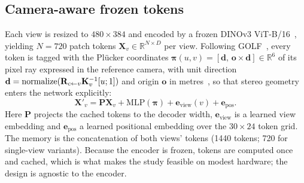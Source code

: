 \subsection{Camera-aware frozen tokens}
\label{sec:tokens}
Each view is resized to $480\times384$ and encoded by a frozen DINOv3 ViT-B/16~\cite{simeoni2025dinov3,oquab2024dinov2,dosovitskiy2021vit}, yielding $N{=}720$ patch tokens $\mathbf{X}_v\in\mathbb{R}^{N\times D}$ per view. Following GOLF~\cite{zou2026golf}, every token is tagged with the Pl\"ucker coordinates $\boldsymbol{\pi}(u,v)=[\mathbf{d},\,\mathbf{o}\times\mathbf{d}]\in\mathbb{R}^6$ of its pixel ray expressed in the reference camera, with unit direction $\mathbf{d}=\mathrm{normalize}(\mathbf{R}_{c\leftarrow v}\mathbf{K}_v^{-1}[u;1])$ and origin $\mathbf{o}$ in metres~\cite{sitzmann2021lfn}, so that stereo geometry enters the network explicitly:
\begin{equation}
  \mathbf{X}'_v = \mathbf{P}\mathbf{X}_v + \mathrm{MLP}(\boldsymbol{\pi}) + \mathbf{e}_{\text{view}}(v) + \mathbf{e}_{\text{pos}}.
  \label{eq:tokens}
\end{equation}
Here $\mathbf{P}$ projects the cached tokens to the decoder width, $\mathbf{e}_{\text{view}}$ is a learned view embedding and $\mathbf{e}_{\text{pos}}$ a learned positional embedding over the $30\times24$ token grid. The memory is the concatenation of both views' tokens (1440 tokens; 720 for single-view variants). Because the encoder is frozen, tokens are computed once and cached, which is what makes the study feasible on modest hardware; the design is agnostic to the encoder.

